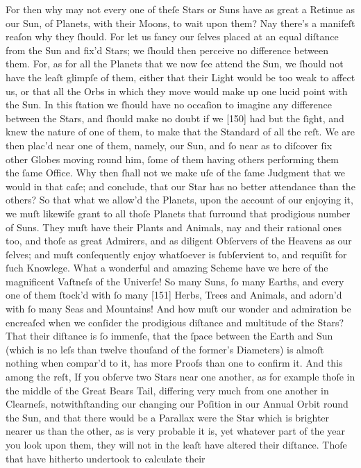 \documentclass[letterpaper]{book}
\begin{document}
For then why may not every one of theſe Stars or Suns have as great a
Retinue as our Sun, of Planets, with their Moons, to wait upon them? Nay
there's a manifeſt reaſon why they ſhould. For let us fancy our ſelves
placed at an equal diſtance from the Sun and fix'd Stars; we ſhould then
perceive no difference between them. For, as for all the Planets that we now
ſee attend the Sun, we ſhould not have the leaſt glimpſe of them, either
that their Light would be too weak to affect us, or that all the Orbs in
which they move would make up one lucid point with the Sun. In this ſtation
we ſhould have no occaſion to imagine any difference between the Stars, and
ſhould make no doubt if we [150] had but the ſight, and knew the nature of
one of them, to make that the Standard of all the reſt. We are then plac'd
near one of them, namely, our Sun, and ſo near as to diſcover ſix other
Globes moving round him, ſome of them having others performing them the ſame
Office.  Why then ſhall not we make uſe of the ſame Judgment that we would
in that caſe; and conclude, that our Star has no better attendance than the
others?  So that what we allow'd the Planets, upon the account of our
enjoying it, we muſt likewiſe grant to all thoſe Planets that ſurround that
prodigious number of Suns. They muſt have their Plants and Animals, nay and
their rational ones too, and thoſe as great Admirers, and as diligent
Obſervers of the Heavens as our ſelves; and muſt conſequently enjoy
whatſoever is ſubſervient to, and requiſit for ſuch Knowlege.  What a
wonderful and amazing Scheme have we here of the magnificent Vaſtneſs of the
Univerſe! So many Suns, ſo many Earths, and every one of them ſtock'd with
ſo many [151] Herbs, Trees and Animals, and adorn'd with ſo many Seas and
Mountains! And how muſt our wonder and admiration be encreaſed when we
conſider the prodigious diſtance and multitude of the Stars?  That their
diſtance is ſo immenſe, that the ſpace between the Earth and Sun (which is
no leſs than twelve thouſand of the former's Diameters) is almoſt nothing
when compar'd to it, has more Proofs than one to confirm it. And this among
the reſt, If you obſerve two Stars near one another, as for example thoſe in
the middle of the Great Bears Tail, differing very much from one another in
Clearneſs, notwithſtanding our changing our Poſition in our Annual Orbit
round the Sun, and that there would be a Parallax were the Star which is
brighter nearer us than the other, as is very probable it is, yet whatever
part of the year you look upon them, they will not in the leaſt have altered
their diſtance. Thoſe that have hitherto undertook to calculate their
\end{document}
